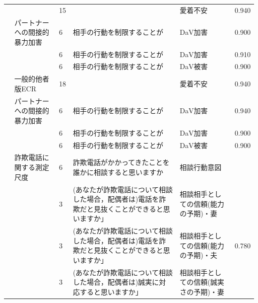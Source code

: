 \begin{landscape}
\begin{longtable}{p{2cm}p{2cm}p{2cm}p{6cm}p{2cm}p{2cm}}
		                         &                                  & 15  &                                                     & 愛着不安                 & 0.940      \\
		                         & パートナーへの間接的暴力加害                   & 6   & 相手の行動を制限することが                                       & DaV加害                & 0.900      \\
		                         &                                  & 6   & 相手の行動を制限することが                                       & DaV加害                & 0.910      \\
		                         &                                  & 6   & 相手の行動を制限することが                                       & DaV被害                & 0.900      \\
		                         & 一般的他者版ECR                        & 18  &                                                     & 愛着不安                 & 0.940      \\
		                         & パートナーへの間接的暴力加害                   & 6   & 相手の行動を制限することが                                       & DaV加害                & 0.940      \\
		                         &                                  & 6   & 相手の行動を制限することが                                       & DaV加害                & 0.900      \\
		                         &                                  & 6   & 相手の行動を制限することが                                       & DaV被害                & 0.900      \\
		\textcite{Moroi202192}      & 詐欺電話に関する測定尺度                     & 6   & 詐欺電話がかかってきたことを誰かに相談すると思いますか                         & 相談行動意図               &            \\
		                         &                                  & 3   & (あなたが詐欺電話について相談した場合，配偶者は)電話を詐欺だと見抜くことができると思いますか」    & 相談相手としての信頼(能力の予期)・妻  &            \\
		                         &                                  & 3   & (あなたが詐欺電話について相談した場合，配偶者は)電話を詐欺だと見抜くことができると思いますか」    & 相談相手としての信頼(能力の予期)・夫  & 0.780      \\
		                         &                                  & 3   & (あなたが詐欺電話について相談した場合，配偶者は)誠実に対応すると思いますか」             & 相談相手としての信頼(誠実さの予期)・妻 &            \\

\end{longtable}
\end{landscape}
